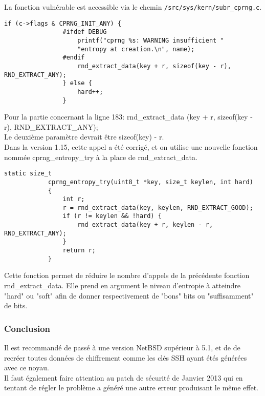			La fonction vulnérable est accessible via le chemin
			\texttt{/src/sys/kern/subr\_cprng.c}.
			
			\begin{lstlisting}[style=customc,caption=subr\_cprng.c(1),
			 label=subrcprng1]
				if (c->flags & CPRNG_INIT_ANY) {
				#ifdef DEBUG
					printf("cprng %s: WARNING insufficient "
					"entropy at creation.\n", name);
				#endif
					rnd_extract_data(key + r, sizeof(key - r), RND_EXTRACT_ANY);
				} else {
					hard++;
				}
			\end{lstlisting}
			
			Pour la partie concernant la ligne 183: rnd\_extract\_data
			(key + r, sizeof(key - r), RND\_EXTRACT\_ANY);\\
			Le deuxième paramètre devrait être sizeof(key) - r.\\
			
			Dans la version 1.15, cette appel a été corrigé,
			et on utilise une nouvelle fonction nommée
			cprng\_entropy\_try \cite{diffNetBSD} à la place de 
			rnd\_extract\_data.\\
			
			\begin{lstlisting}[style=customc,caption=subr\_cprng.c(2),
			 label=subrcprng2]
			static size_t
 	 		cprng_entropy_try(uint8_t *key, size_t keylen, int hard)
 	 		{
 	        	int r;
 	         	r = rnd_extract_data(key, keylen, RND_EXTRACT_GOOD);
 	         	if (r != keylen && !hard) {
 	            	rnd_extract_data(key + r, keylen - r, RND_EXTRACT_ANY);
 	         	}
 	    		return r;
 	    	}
			\end{lstlisting}

			Cette fonction permet de réduire le nombre d'appels de la
			précédente fonction rnd\_extract\_data.
			Elle prend en argument le niveau d'entropie à atteindre "hard"
			ou "soft" afin de donner respectivement de "bons" bits ou
			"suffisamment" de bits.\\
			

		\subsubsection{Conclusion}
			
			Il est recommandé de passé à une version NetBSD supérieur à 5.1, et
			de de recréer toutes données de chiffrement comme les clés SSH
			ayant étés générées avec ce noyau.\\
			
			Il faut également faire attention au patch de sécurité de Janvier 2013
			qui en tentant de régler le problème a généré une autre erreur produisant
			le même effet.\\
			
